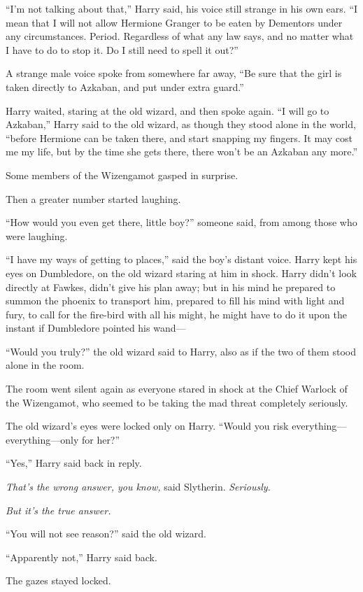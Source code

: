 “I’m not talking about that,” Harry said, his voice still strange in his own ears. “I mean that I will not allow Hermione Granger to be eaten by Dementors under any circumstances. Period. Regardless of what any law says, and no matter what I have to do to stop it. Do I still need to spell it out?”

A strange male voice spoke from somewhere far away, “Be sure that the girl is taken directly to Azkaban, and put under extra guard.”

Harry waited, staring at the old wizard, and then spoke again. “I will go to Azkaban,” Harry said to the old wizard, as though they stood alone in the world, “before Hermione can be taken there, and start snapping my fingers. It may cost me my life, but by the time she gets there, there won’t be an Azkaban any more.”

Some members of the Wizengamot gasped in surprise.

Then a greater number started laughing.

“How would you even get there, little boy?” someone said, from among those who were laughing.

“I have my ways of getting to places,” said the boy’s distant voice. Harry kept his eyes on Dumbledore, on the old wizard staring at him in shock. Harry didn’t look directly at Fawkes, didn’t give his plan away; but in his mind he prepared to summon the phoenix to transport him, prepared to fill his mind with light and fury, to call for the fire-bird with all his might, he might have to do it upon the instant if Dumbledore pointed his wand—

“Would you truly?” the old wizard said to Harry, also as if the two of them stood alone in the room.

The room went silent again as everyone stared in shock at the Chief Warlock of the Wizengamot, who seemed to be taking the mad threat completely seriously.

The old wizard’s eyes were locked only on Harry. “Would you risk everything—everything—only for her?”

“Yes,” Harry said back in reply.

\emph{That’s the wrong answer, you know,} said Slytherin. \emph{Seriously.}

\emph{But it’s the true answer.}

“You will not see reason?” said the old wizard.

“Apparently not,” Harry said back.

The gazes stayed locked.


